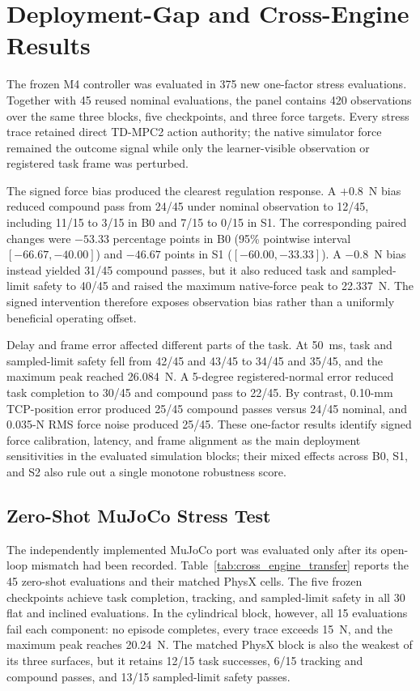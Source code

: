 \section{Deployment-Gap and Cross-Engine Results}
\label{sec:deployment_gap_results}

The frozen M4 controller was evaluated in 375 new one-factor stress
evaluations.  Together with 45 reused nominal evaluations, the panel contains
420 observations over the same three blocks, five checkpoints, and three
force targets.  Every stress trace retained direct TD-MPC2 action authority;
the native simulator force remained the outcome signal while only the
learner-visible observation or registered task frame was perturbed.



The signed force bias produced the clearest regulation response.  A
$+0.8$~N bias reduced compound pass from 24/45 under nominal observation to
12/45, including 11/15 to 3/15 in B0 and 7/15 to 0/15 in S1.  The corresponding
paired changes were $-53.33$ percentage points in B0 (95\% pointwise interval
$[-66.67,-40.00]$) and $-46.67$ points in S1 ($[-60.00,-33.33]$).  A
$-0.8$~N bias instead yielded 31/45 compound passes, but it also reduced task
and sampled-limit safety to 40/45 and raised the maximum native-force peak to
22.337~N.  The signed intervention therefore exposes observation bias rather
than a uniformly beneficial operating offset.

Delay and frame error affected different parts of the task.  At 50~ms,
task and sampled-limit safety fell from 42/45 and 43/45 to 34/45 and 35/45,
and the maximum peak reached 26.084~N.  A 5-degree registered-normal error
reduced task completion to 30/45 and compound pass to 22/45.  By contrast,
0.10-mm TCP-position error produced 25/45 compound passes versus 24/45
nominal, and 0.035-N RMS force noise produced 25/45.  These one-factor results
identify signed force calibration, latency, and frame alignment as the main
deployment sensitivities in the evaluated simulation blocks; their mixed
effects across B0, S1, and S2 also rule out a single monotone robustness score.

\subsection{Zero-Shot MuJoCo Stress Test}

The independently implemented MuJoCo port was evaluated only after its
open-loop mismatch had been recorded. Table~\ref{tab:cross_engine_transfer}
reports the 45 zero-shot evaluations and their matched PhysX cells. The five
frozen checkpoints achieve task completion, tracking, and sampled-limit safety
in all 30 flat and inclined evaluations. In the cylindrical block, however,
all 15 evaluations fail each component: no episode completes, every trace
exceeds 15~N, and the maximum peak reaches 20.24~N. The matched PhysX block
is also the weakest of its three surfaces, but it retains 12/15 task
successes, 6/15 tracking and compound passes, and 13/15 sampled-limit safety
passes.

